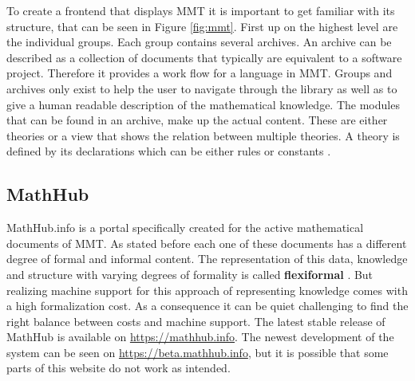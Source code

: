 \documentclass[11pt,a4paper]{article}
\begin{document}
To create a frontend that displays MMT it is important to get familiar with its structure, that can be seen in Figure \ref{fig:mmt}.
First up on the highest level are the individual groups.
Each group contains several archives.
An archive can be described as a collection of documents that typically are equivalent to a software project.
Therefore it provides a work flow for a language in MMT.
Groups and archives only exist to help the user to navigate through the library as well as to give a human readable description of the mathematical knowledge.
The modules that can be found in an archive, make up the actual content.
These are either theories or a view that shows the relation between multiple theories.
A theory is defined by its declarations which can be either rules or constants \cite{mmt}.

\subsection{MathHub} \label{mathhub}
MathHub.info is a portal specifically created for the active mathematical documents of MMT.
As stated before each one of these documents has a different degree of formal and informal content.
The representation of this data, knowledge and structure with varying degrees of formality is called \textbf{flexiformal} \cite{flexiforms}.
But realizing machine support for this approach of representing knowledge comes with a high formalization cost.
As a consequence it can be quiet challenging to find the right balance between costs and machine support.
The latest stable release of MathHub is available on \url{https://mathhub.info}.
The newest development of the system can be seen on \url{https://beta.mathhub.info}, but it is possible that some parts of this website do not work as intended. 
\end{document}
